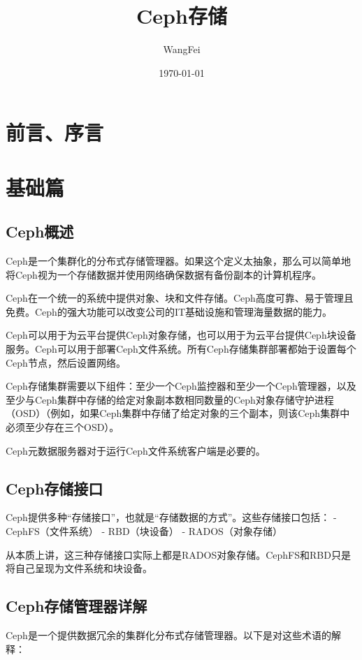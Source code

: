 \documentclass[12pt,UTF8]{ctexbook}
\title{\heiti\zihao{0} Ceph存储}
\author{WangFei}
\date{\today}
\begin{document}
\maketitle
\tableofcontents

\frontmatter
\chapter{前言、序言}

\mainmatter

\chapter{基础篇}
\section{Ceph概述}

Ceph是一个集群化的分布式存储管理器。如果这个定义太抽象，那么可以简单地将Ceph视为一个存储数据并使用网络确保数据有备份副本的计算机程序。

Ceph在一个统一的系统中提供对象、块和文件存储。Ceph高度可靠、易于管理且免费。Ceph的强大功能可以改变公司的IT基础设施和管理海量数据的能力。

Ceph可以用于为云平台提供Ceph对象存储，也可以用于为云平台提供Ceph块设备服务。Ceph可以用于部署Ceph文件系统。所有Ceph存储集群部署都始于设置每个Ceph节点，然后设置网络。

Ceph存储集群需要以下组件：至少一个Ceph监控器和至少一个Ceph管理器，以及至少与Ceph集群中存储的给定对象副本数相同数量的Ceph对象存储守护进程（OSD）（例如，如果Ceph集群中存储了给定对象的三个副本，则该Ceph集群中必须至少存在三个OSD）。

Ceph元数据服务器对于运行Ceph文件系统客户端是必要的。

\section{Ceph存储接口}

Ceph提供多种“存储接口”，也就是“存储数据的方式”。这些存储接口包括：
- CephFS（文件系统）
- RBD（块设备）
- RADOS（对象存储）

从本质上讲，这三种存储接口实际上都是RADOS对象存储。CephFS和RBD只是将自己呈现为文件系统和块设备。

\section{Ceph存储管理器详解}

Ceph是一个提供数据冗余的集群化分布式存储管理器。以下是对这些术语的解释：
\end{document}
